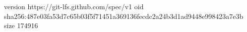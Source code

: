 version https://git-lfs.github.com/spec/v1
oid sha256:487e03fa53d7c65b03f5f71451a369136fecdc2a24b3d1ad9448e998423a7e3b
size 174916
